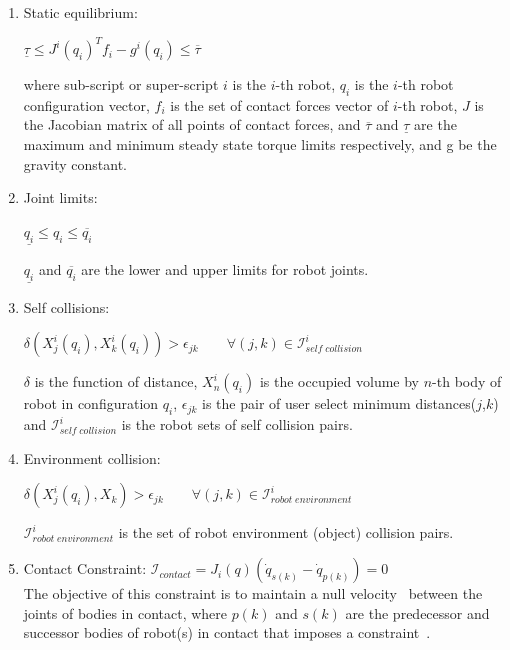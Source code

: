\begin{enumerate}	
	\item Static equilibrium:

	$\underline{\tau} \leq J^i(q_i)^Tf_i - g^i(q_i) \leq \overline{\tau}$
	
	where sub-script or super-script $i$ is the $i$-th robot, $q_i$ is the $i$-th robot configuration vector, $f_i$ is the set of contact forces vector of $i$-th robot, $J$ is the Jacobian matrix of all points of contact forces, and $\overline{\tau}$ and $\underline{\tau}$ are the maximum and minimum steady state torque limits respectively, and g be the gravity constant.
	
	\item Joint limits:
	
	$\underline{q_i} \leq q_i \leq \overline{q_i}$
	
	$\underline{q_i}$ and $\overline{q_i}$ are the lower and upper limits for robot joints.
	
	\item Self collisions:
	
	$\delta(X^i_j(q_i), X^i_k(q_i)) > \epsilon_{jk} \qquad \forall(j,k)\in {\mathscr{I}}^i_{self\; collision}$
	
	$\delta$ is the function of distance, $X^i_n(q_i)$ is the occupied volume by $n$-th body of robot in configuration $q_i$, $\epsilon_{jk}$ is the pair of user select minimum distances($j$,$k$) and ${\mathscr{I}}^i_{self\;collision}$ is the robot sets of self collision pairs.
	
	\item Environment collision:
	
	$\delta(X^i_j(q_i), X_k) > \epsilon_{jk} \qquad \forall(j,k)\in {\mathscr{I}}^i_{robot\;environment}$
	
	${\mathscr{I}}^i_{robot\;environment}$ is the set of robot environment (object) collision pairs.
	
	\item Contact Constraint: $\mathscr{I}_{contact} = J_i(q) (\dot{q}_{s(k)} - \dot{q}_{p(k)}) = 0$\\
	The objective of this constraint is to maintain a null velocity~\cite{ohwovoriole1980externsion} between the joints of bodies in contact, where $p(k)$ and $s(k)$ are the predecessor and successor bodies of robot(s) in contact that imposes a constraint~\cite{featherstone2014rigid}.
\end{enumerate}



